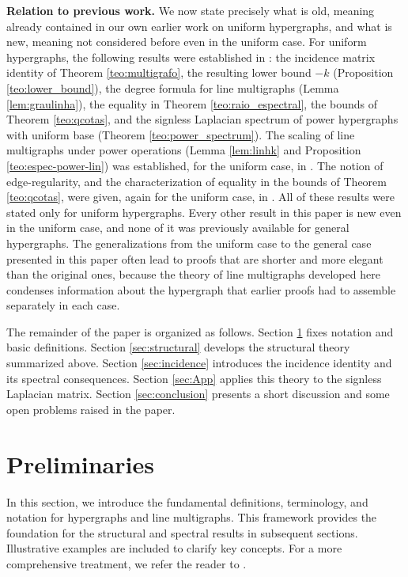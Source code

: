 \documentclass[12pt,reqno]{amsart}
\begin{document}
\medskip
\noindent\textbf{Relation to previous work.} We now state precisely what is old, meaning already contained in our own earlier work on uniform hypergraphs, and what is new, meaning not considered before even in the uniform case. For uniform hypergraphs, the following results were established in \cite{kaue-lap}: the incidence matrix identity of Theorem \ref{teo:multigrafo}, the resulting lower bound $-k$ (Proposition \ref{teo:lower_bound}), the degree formula for line multigraphs (Lemma \ref{lem:graulinha}), the equality in Theorem \ref{teo:raio_espectral}, the bounds of Theorem \ref{teo:qcotas}, and the signless Laplacian spectrum of power hypergraphs with uniform base (Theorem \ref{teo:power_spectrum}). The scaling of line multigraphs under power operations (Lemma \ref{lem:linhk} and Proposition \ref{teo:espec-power-lin}) was established, for the uniform case, in \cite{kaue-energia}. The notion of edge-regularity, and the characterization of equality in the bounds of Theorem \ref{teo:qcotas}, were given, again for the uniform case, in \cite{kaue-sign-vector}. All of these results were stated only for uniform hypergraphs. Every other result in this paper is new even in the uniform case, and none of it was previously available for general hypergraphs. The generalizations from the uniform case to the general case presented in this paper often lead to proofs that are shorter and more elegant than the original ones, because the theory of line multigraphs developed here condenses information about the hypergraph that earlier proofs had to assemble separately in each case.

The remainder of the paper is organized as follows. Section \ref{sec:pre} fixes notation and basic definitions. Section \ref{sec:structural} develops the structural theory summarized above. Section \ref{sec:incidence} introduces the incidence identity and its spectral consequences. Section \ref{sec:App} applies this theory to the signless Laplacian matrix. Section \ref{sec:conclusion} presents a short discussion and some open problems raised in the paper.

\section{Preliminaries}\label{sec:pre}

In this section, we introduce the fundamental definitions, terminology, and notation for hypergraphs and line multigraphs. This framework provides the foundation for the structural and spectral results in subsequent sections. Illustrative examples are included to clarify key concepts. For a more comprehensive treatment, we refer the reader to \cite{Bretto,kaue-lap}.
\end{document}

